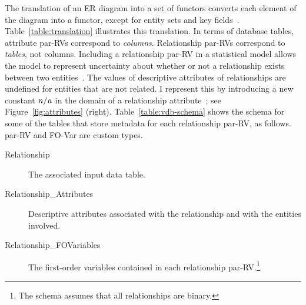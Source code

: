 \documentclass{sfuthesis}
\begin{document}
The translation of an ER diagram into a set of functors converts each element of the diagram into a functor, except for entity sets and key fields~\cite{Heckerman+al:SRL07}. Table~\ref{table:translation} illustrates this translation. In terms of database tables, attribute par-RVs correspond to {\em columns}. Relationship par-RVs correspond to {\em tables}, not columns. Including a relationship par-RV in a statistical model allows the model to represent uncertainty about whether or not a relationship exists between two entities~\cite{Kimmig2015}. The values of descriptive attributes of relationships are undefined for entities that are not related. I  represent this by introducing a new constant $\it{n/a}$ in the domain of a relationship attribute~\cite{Milch2005}; see Figure~\ref{fig:attributes} (right). Table~\ref{table:vdb-schema} shows the schema for some of the tables that store metadata for 
each relationship par-RV, as follows. par-RV and FO-Var are custom types.

\begin{description}
\item[Relationship] The associated input data table.
\item[Relationship\_Attributes] Descriptive attributes associated with the relationship and with the entities involved.
\item[Relationship\_FOVariables] The first-order variables contained in each relationship par-RV.\footnote{The schema assumes that all relationships are binary.}
\end{description}


\begin{table}[btp]
\caption{Translation from an ER Diagram to Par-RVs}
 \centering
{}
 \label{table:translation}
\end{table}
\end{document}
